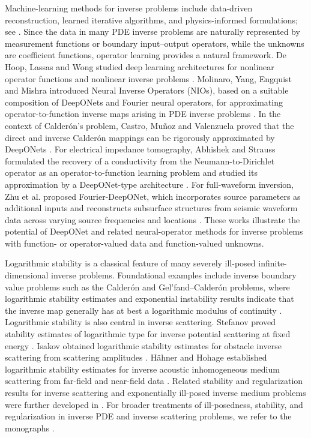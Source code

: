 \documentclass{article}
\numberwithin{equation}{section}
\theoremstyle{plain}
\newcounter{method}
\begin{document}
	Machine-learning methods for inverse problems include data-driven reconstruction, learned iterative algorithms, and physics-informed formulations; see \cite{AMOS19,AO17,AO18,RPK19}. Since the data in many PDE inverse problems are naturally represented by measurement functions or boundary input--output operators, while the unknowns are coefficient functions, operator learning provides a natural framework. De Hoop, Lassas and Wong studied deep learning architectures for nonlinear operator functions and nonlinear inverse problems \cite{HLW21}. Molinaro, Yang, Engquist and Mishra introduced Neural Inverse Operators (NIOs), based on a suitable composition of DeepONets and Fourier neural operators, for approximating operator-to-function inverse maps arising in PDE inverse problems \cite{MYEM23}. In the context of Calder\'on's problem, Castro, Mu\~noz and Valenzuela proved that the direct and inverse Calder\'on mappings can be rigorously approximated by DeepONets \cite{CMV24}. For electrical impedance tomography, Abhishek and Strauss formulated the recovery of a conductivity from the Neumann-to-Dirichlet operator as an operator-to-function learning problem and studied its approximation by a DeepONet-type architecture \cite{AS26}. For full-waveform inversion, Zhu et al. proposed Fourier-DeepONet, which incorporates source parameters as additional inputs and reconstructs subsurface structures from seismic waveform data across varying source frequencies and locations \cite{ZFLL23}. These works illustrate the potential of DeepONet and related
	neural-operator methods for inverse problems with function- or
	operator-valued data and function-valued unknowns.
	
	Logarithmic stability is a classical feature of many severely ill-posed infinite-dimensional inverse problems. Foundational examples include inverse boundary value problems such as the Calder\'on and Gel'fand--Calder\'on problems, where logarithmic stability estimates and exponential instability results indicate that the inverse map generally has at best a logarithmic modulus of continuity \cite{Ale88,Man01,Nov11}. Logarithmic stability is also central in inverse scattering. Stefanov proved stability estimates of logarithmic type for inverse potential scattering at fixed energy \cite{Ste90}. Isakov obtained logarithmic stability estimates for obstacle inverse scattering from scattering amplitudes \cite{Isa92}. H\"ahner and Hohage established logarithmic stability estimates for inverse acoustic inhomogeneous medium scattering from far-field and near-field data \cite{HH01}. Related stability and regularization results for inverse scattering and exponentially ill-posed inverse medium problems were further developed in \cite{Sin06,HW15}. For broader treatments of ill-posedness, stability, and regularization in inverse PDE and inverse scattering problems, we refer to the monographs \cite{Isa06,CK19}.
	
\end{document}
